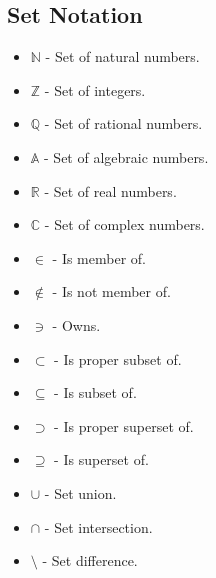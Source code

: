 \documentclass{article}
\begin{document}
\subsection*{Set Notation}
\begin{itemize}
    \item $\mathbb{N}$ - Set of natural numbers.
    \item $\mathbb{Z}$ - Set of integers.
    \item $\mathbb{Q}$ - Set of rational numbers.
    \item $\mathbb{A}$ - Set of algebraic numbers.
    \item $\mathbb{R}$ - Set of real numbers.
    \item $\mathbb{C}$ - Set of complex numbers.
    \item $\in$ - Is member of.
    \item $\notin$ - Is not member of.
    \item $\ni$ - Owns.
    \item $\subset$ - Is proper subset of.
    \item $\subseteq$ - Is subset of.
    \item $\supset$ - Is proper superset of.
    \item $\supseteq$ - Is superset of.
    \item $\cup$ - Set union.
    \item $\cap$ - Set intersection.
    \item $\setminus$ - Set difference.
\end{itemize}
\end{document}
